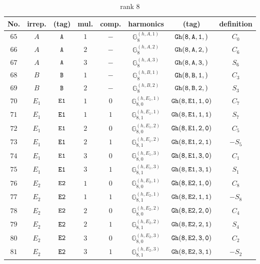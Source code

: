 \documentclass[fleqn,8pt]{jsarticle}
\begin{document}
\begin{table}[ht!]
\begin{center}
\caption{rank 8}
\renewcommand{\arraystretch}{1.3}
\begin{tabular}{cccccccc} \hline \hline
No. & irrep. & (tag) & mul. & comp. & harmonics & (tag) & definition \\ \hline
$ 65 $ & $ A $ & $ {\tt A} $ & $ 1 $ & $ - $ & $ \mathbb{G}_{8}^{(h,A,1)} $ & $ {\tt Gh(8,A,1,)} $ & $ C_{0} $ \\
$ 66 $ & $ A $ & $ {\tt A} $ & $ 2 $ & $ - $ & $ \mathbb{G}_{8}^{(h,A,2)} $ & $ {\tt Gh(8,A,2,)} $ & $ C_{6} $ \\
$ 67 $ & $ A $ & $ {\tt A} $ & $ 3 $ & $ - $ & $ \mathbb{G}_{8}^{(h,A,3)} $ & $ {\tt Gh(8,A,3,)} $ & $ S_{6} $ \\
$ 68 $ & $ B $ & $ {\tt B} $ & $ 1 $ & $ - $ & $ \mathbb{G}_{8}^{(h,B,1)} $ & $ {\tt Gh(8,B,1,)} $ & $ C_{3} $ \\
$ 69 $ & $ B $ & $ {\tt B} $ & $ 2 $ & $ - $ & $ \mathbb{G}_{8}^{(h,B,2)} $ & $ {\tt Gh(8,B,2,)} $ & $ S_{3} $ \\
$ 70 $ & $ E_{1} $ & $ {\tt E1} $ & $ 1 $ & $ 0 $ & $ \mathbb{G}_{8,0}^{(h,E_{1},1)} $ & $ {\tt Gh(8,E1,1,0)} $ & $ C_{7} $ \\
$ 71 $ & $ E_{1} $ & $ {\tt E1} $ & $ 1 $ & $ 1 $ & $ \mathbb{G}_{8,1}^{(h,E_{1},1)} $ & $ {\tt Gh(8,E1,1,1)} $ & $ S_{7} $ \\
$ 72 $ & $ E_{1} $ & $ {\tt E1} $ & $ 2 $ & $ 0 $ & $ \mathbb{G}_{8,0}^{(h,E_{1},2)} $ & $ {\tt Gh(8,E1,2,0)} $ & $ C_{5} $ \\
$ 73 $ & $ E_{1} $ & $ {\tt E1} $ & $ 2 $ & $ 1 $ & $ \mathbb{G}_{8,1}^{(h,E_{1},2)} $ & $ {\tt Gh(8,E1,2,1)} $ & $ - S_{5} $ \\
$ 74 $ & $ E_{1} $ & $ {\tt E1} $ & $ 3 $ & $ 0 $ & $ \mathbb{G}_{8,0}^{(h,E_{1},3)} $ & $ {\tt Gh(8,E1,3,0)} $ & $ C_{1} $ \\
$ 75 $ & $ E_{1} $ & $ {\tt E1} $ & $ 3 $ & $ 1 $ & $ \mathbb{G}_{8,1}^{(h,E_{1},3)} $ & $ {\tt Gh(8,E1,3,1)} $ & $ S_{1} $ \\
$ 76 $ & $ E_{2} $ & $ {\tt E2} $ & $ 1 $ & $ 0 $ & $ \mathbb{G}_{8,0}^{(h,E_{2},1)} $ & $ {\tt Gh(8,E2,1,0)} $ & $ C_{8} $ \\
$ 77 $ & $ E_{2} $ & $ {\tt E2} $ & $ 1 $ & $ 1 $ & $ \mathbb{G}_{8,1}^{(h,E_{2},1)} $ & $ {\tt Gh(8,E2,1,1)} $ & $ - S_{8} $ \\
$ 78 $ & $ E_{2} $ & $ {\tt E2} $ & $ 2 $ & $ 0 $ & $ \mathbb{G}_{8,0}^{(h,E_{2},2)} $ & $ {\tt Gh(8,E2,2,0)} $ & $ C_{4} $ \\
$ 79 $ & $ E_{2} $ & $ {\tt E2} $ & $ 2 $ & $ 1 $ & $ \mathbb{G}_{8,1}^{(h,E_{2},2)} $ & $ {\tt Gh(8,E2,2,1)} $ & $ S_{4} $ \\
$ 80 $ & $ E_{2} $ & $ {\tt E2} $ & $ 3 $ & $ 0 $ & $ \mathbb{G}_{8,0}^{(h,E_{2},3)} $ & $ {\tt Gh(8,E2,3,0)} $ & $ C_{2} $ \\
$ 81 $ & $ E_{2} $ & $ {\tt E2} $ & $ 3 $ & $ 1 $ & $ \mathbb{G}_{8,1}^{(h,E_{2},3)} $ & $ {\tt Gh(8,E2,3,1)} $ & $ - S_{2} $ \\
 \hline \hline
\end{tabular}
\end{center}
\end{table}
\end{document}
